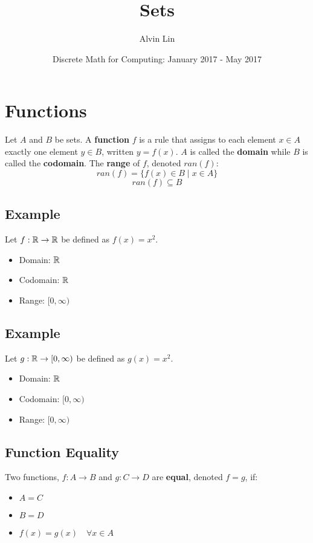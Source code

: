 \documentclass{math}
\title{Sets}
\author{Alvin Lin}
\date{Discrete Math for Computing: January 2017 - May 2017}
\begin{document}
\maketitle

\section*{Functions}
Let \( A \) and \( B \) be sets. A \textbf{function} \( f \) is a rule that
assigns to each element \( x \in A \) exactly one element \( y \in B \),
written \( y = f(x) \). \( A \) is called the \textbf{domain} while \( B \)
is called the \textbf{codomain}. The \textbf{range} of \( f \), denoted
\( ran(f) \):
\[ ran(f) = \{f(x) \in B\mid x \in A \} \]
\[ ran(f) \subseteq B \]

\subsection*{Example}
Let \( f:\mathbb{R}\to\mathbb{R} \) be defined as \( f(x) = x^{2} \).
\begin{itemize}
  \item Domain: \( \mathbb{R} \)
  \item Codomain: \( \mathbb{R} \)
  \item Range: \( \big[0,\infty\big) \)
\end{itemize}

\subsection*{Example}
Let \( g:\mathbb{R}\to[0,\infty) \) be defined as \( g(x) = x^{2} \).
\begin{itemize}
  \item Domain: \( \mathbb{R} \)
  \item Codomain: \( \big[0,\infty\big) \)
  \item Range: \( \big[0,\infty\big) \)
\end{itemize}

\subsection*{Function Equality}
Two functions, \( f:A\to B \) and \( g:C\to D \) are \textbf{equal}, denoted
\( f = g \), if:
\begin{itemize}
  \item \( A = C \)
  \item \( B = D \)
  \item \( f(x) = g(x) \quad \forall{x}\in A \)
\end{itemize}
\end{document}
